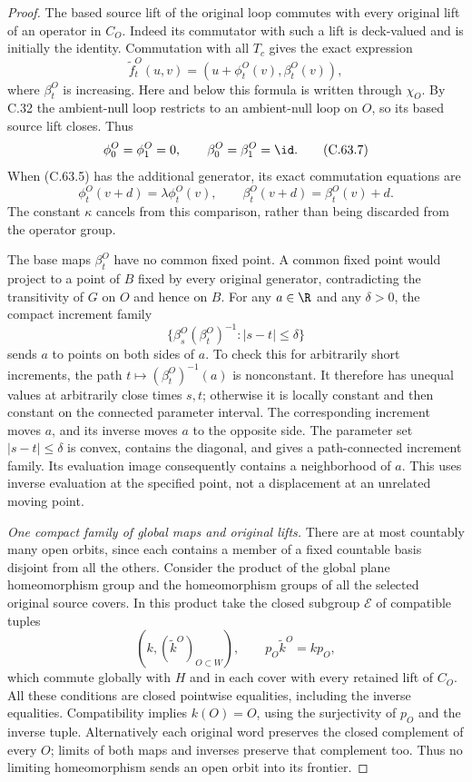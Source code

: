\begin{proof}
The based source lift of the original loop commutes
with every original lift of an operator in $C_O$.
Indeed its commutator with such a lift is deck-valued
and is initially the identity. Commutation with all
$T_c$ gives the exact expression
\[
 \widetilde f_t^O(u,v)=(u+\phi_t^O(v),\beta_t^O(v)),
                                                               \tag{C.63.6}
\]
where $\beta_t^O$ is increasing. Here and below this
formula is written through $\chi_O$. By C.32 the
ambient-null loop restricts to an ambient-null loop
on $O$, so its based source lift closes. Thus
\[
 \phi_0^O=\phi_1^O=0,
       \qquad\beta_0^O=\beta_1^O=\id.                 \tag{C.63.7}
\]
When (C.63.5) has the additional generator, its exact
commutation equations are
\[
 \phi_t^O(v+d)=\lambda\phi_t^O(v),\qquad
 \beta_t^O(v+d)=\beta_t^O(v)+d.                         \tag{C.63.8}
\]
The constant $\kappa$ cancels from this comparison,
rather than being discarded from the operator group.

The base maps $\beta_t^O$ have no common fixed point.
A common fixed point would project to a point of $B$
fixed by every original generator, contradicting the
transitivity of $G$ on $O$ and hence on $B$.
For any $a\in\R$ and any $\delta>0$, the compact
increment family
\[
 \{\beta_s^O(\beta_t^O)^{-1}:|s-t|\leq\delta\}
                                                               \tag{C.63.9}
\]
sends $a$ to points on both sides of $a$. To check
this for arbitrarily short increments, the path
$t\mapsto(\beta_t^O)^{-1}(a)$ is nonconstant. It
therefore has unequal values at arbitrarily close
times $s,t$; otherwise it is locally constant and
then constant on the connected parameter interval.
The corresponding increment moves $a$, and its
inverse moves $a$ to the opposite side. The
parameter set $|s-t|\leq\delta$ is convex, contains
the diagonal, and gives a path-connected increment
family. Its evaluation image consequently contains
a neighborhood of $a$. This uses inverse evaluation
at the specified point, not a displacement at an
unrelated moving point.

\emph{One compact family of global maps and original lifts.}
There are at most countably many open orbits, since
each contains a member of a fixed countable basis
disjoint from all the others. Consider the product
of the global plane homeomorphism group and the
homeomorphism groups of all the selected original
source covers. In this product take the closed
subgroup $\mathcal E$ of compatible tuples
\[
             (k,(\widetilde k^O)_{O\subset W}),
       \qquad p_O\widetilde k^O=k p_O,                 \tag{C.63.10}
\]
which commute globally with $H$ and in each cover
with every retained lift of $C_O$.
All these conditions are closed pointwise
equalities, including the inverse equalities.
Compatibility implies $k(O)=O$, using the
surjectivity of $p_O$ and the inverse tuple.
Alternatively each original word preserves the
closed complement of every $O$; limits of both
maps and inverses preserve that complement too.
Thus no limiting homeomorphism sends an open
orbit into its frontier.


\end{proof}
